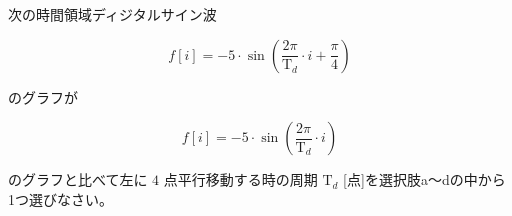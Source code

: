 次の時間領域ディジタルサイン波 

\[
f[i] = -5 \cdot \sin \left ( \frac{2 \pi}{\textrm{T}_d}  \cdot i + \frac{\pi}{4} \right )
\]

\noindent のグラフが

\[
f[i] = -5 \cdot \sin \left ( \frac{2 \pi}{\textrm{T}_d} \cdot i \right )
\]

\noindent のグラフと比べて左に $4$ 点平行移動する時の周期 $\textrm{T}_d$ [点]を選択肢a〜dの中から1つ選びなさい。
